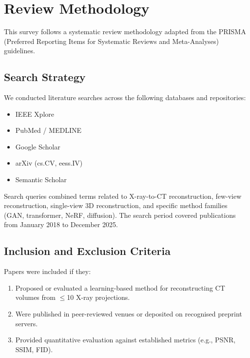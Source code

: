 
\section{Review Methodology}
\label{sec:methodology}

This survey follows a systematic review methodology adapted from the PRISMA (Preferred Reporting Items for Systematic Reviews and Meta-Analyses) guidelines.

\subsection{Search Strategy}

We conducted literature searches across the following databases and repositories:
\begin{itemize}
  \item IEEE Xplore
  \item PubMed / MEDLINE
  \item Google Scholar
  \item arXiv (cs.CV, eess.IV)
  \item Semantic Scholar
\end{itemize}

Search queries combined terms related to X-ray-to-CT reconstruction, few-view reconstruction, single-view 3D reconstruction, and specific method families (GAN, transformer, NeRF, diffusion). The search period covered publications from January 2018 to December 2025.

\subsection{Inclusion and Exclusion Criteria}

Papers were included if they:
\begin{enumerate}
  \item Proposed or evaluated a learning-based method for reconstructing CT volumes from $\leq$10 X-ray projections.
  \item Were published in peer-reviewed venues or deposited on recognised preprint servers.
  \item Provided quantitative evaluation against established metrics (e.g., PSNR, SSIM, FID).
\end{enumerate}

